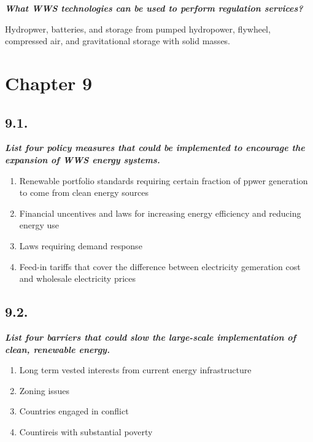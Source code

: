 \documentclass[
  letterpaper,
  DIV=11,
  numbers=noendperiod]{scrartcl}
\providecommand{\tightlist}{%
  \setlength{\itemsep}{0pt}\setlength{\parskip}{0pt}}\usepackage{longtable,booktabs,array}
\begin{document}
\textbf{\emph{What WWS technologies can be used to perform regulation
services?}}

Hydropwer, batteries, and storage from pumped hydropower, flywheel,
compressed air, and gravitational storage with solid masses.

\hypertarget{chapter-9}{%
\section{Chapter 9}\label{chapter-9}}

\hypertarget{section-15}{%
\subsection{9.1.}\label{section-15}}

\textbf{\emph{List four policy measures that could be implemented to
encourage the expansion of WWS energy systems.}}

\begin{enumerate}
\def\labelenumi{\arabic{enumi}.}
\tightlist
\item
  Renewable portfolio standards requiring certain fraction of ppwer
  generation to come from clean energy sources
\item
  Financial uncentives and laws for increasing energy efficiency and
  reducing energy use
\item
  Laws requiring demand response
\item
  Feed-in tariffs that cover the difference between electricity
  gemeration cost and wholesale electricity prices
\end{enumerate}

\hypertarget{section-16}{%
\subsection{9.2.}\label{section-16}}

\textbf{\emph{List four barriers that could slow the large-scale
implementation of clean, renewable energy.}}

\begin{enumerate}
\def\labelenumi{\arabic{enumi}.}
\tightlist
\item
  Long term vested interests from current energy infrastructure
\item
  Zoning issues
\item
  Countries engaged in conflict
\item
  Countireis with substantial poverty
\end{enumerate}
\end{document}
